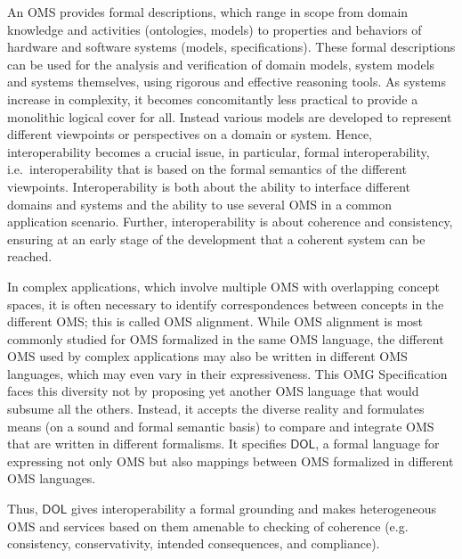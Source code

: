 \documentclass[10pt, a4paper]{isov2}
\makeatletter
\newcommand*{\eg}{e.g.\@\xspace}
\newcommand*{\IS}{OMG Specification\xspace}
\newcommand*{\DOL}{\ensuremath{\mathsf{DOL}}\xspace}
\makeatother
\begin{document}
An OMS provides formal descriptions, which range in scope from domain knowledge and activities
(ontologies, models) to properties and behaviors of hardware and software systems (models,
specifications). These formal descriptions can be used for the analysis and verification of domain
models, system models and systems themselves, using rigorous and effective reasoning tools.   As 
systems increase in complexity, it becomes concomitantly less practical to provide a monolithic 
logical cover for all.  Instead various models are developed to represent different viewpoints or 
perspectives on a domain or system. 
 Hence, interoperability becomes
a crucial issue, in particular, formal interoperability, i.e.\ interoperability that is based on
the formal semantics of the different viewpoints. Interoperability is both about the ability to 
interface different domains and systems and the ability to use several OMS in a common application
scenario. Further,  interoperability is about coherence and consistency, ensuring at an early stage of the development
that a coherent system can be reached.


In complex applications, which involve multiple OMS with overlapping concept spaces,
it is often necessary to identify correspondences between concepts in the different OMS; this is called  OMS alignment. 
While OMS alignment is most commonly studied for OMS formalized in the same OMS 
language, the different OMS used by complex applications may also be written in different 
OMS languages, which may even vary in their expressiveness. 
This \IS faces this diversity not by proposing yet another OMS language that would subsume all the others.  
Instead, it accepts the diverse reality and formulates means (on a sound and formal semantic basis) 
to compare and integrate OMS that are written in different formalisms.
It specifies \DOL, a formal language for
expressing not only OMS but also mappings between OMS formalized in different OMS languages.

Thus, \DOL gives interoperability a formal grounding and makes heterogeneous OMS and services based
on them amenable to checking of coherence (\eg consistency, conservativity, intended consequences,
and compliance).


\end{document}
